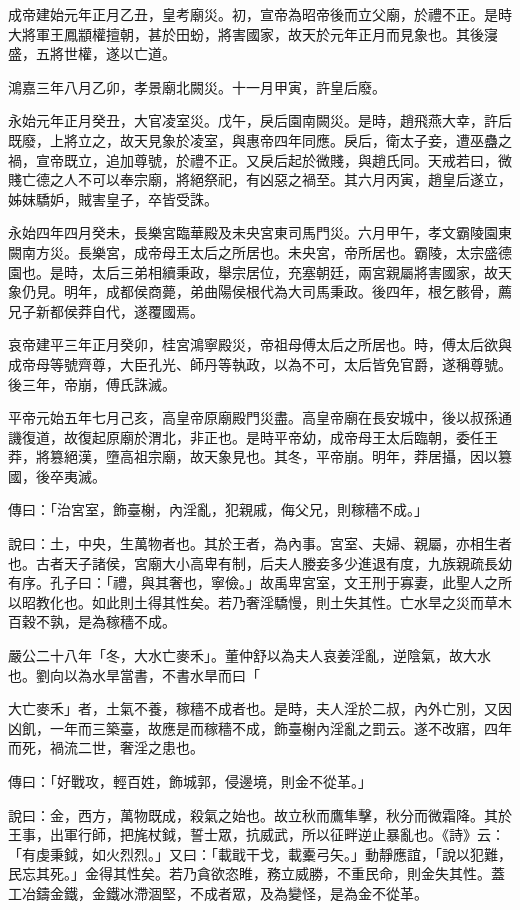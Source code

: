 \begin{pinyinscope}
成帝建始元年正月乙丑，皇考廟災。初，宣帝為昭帝後而立父廟，於禮不正。是時大將軍王鳳顓權擅朝，甚於田蚡，將害國家，故天於元年正月而見象也。其後寖盛，五將世權，遂以亡道。

鴻嘉三年八月乙卯，孝景廟北闕災。十一月甲寅，許皇后廢。

永始元年正月癸丑，大官凌室災。戊午，戾后園南闕災。是時，趙飛燕大幸，許后既廢，上將立之，故天見象於凌室，與惠帝四年同應。戾后，衛太子妾，遭巫蠱之禍，宣帝既立，追加尊號，於禮不正。又戾后起於微賤，與趙氏同。天戒若曰，微賤亡德之人不可以奉宗廟，將絕祭祀，有凶惡之禍至。其六月丙寅，趙皇后遂立，姊妺驕妒，賊害皇子，卒皆受誅。

永始四年四月癸未，長樂宮臨華殿及未央宮東司馬門災。六月甲午，孝文霸陵園東闕南方災。長樂宮，成帝母王太后之所居也。未央宮，帝所居也。霸陵，太宗盛德園也。是時，太后三弟相續秉政，舉宗居位，充塞朝廷，兩宮親屬將害國家，故天象仍見。明年，成都侯商薨，弟曲陽侯根代為大司馬秉政。後四年，根乞骸骨，薦兄子新都侯莽自代，遂覆國焉。

哀帝建平三年正月癸卯，桂宮鴻寧殿災，帝祖母傅太后之所居也。時，傅太后欲與成帝母等號齊尊，大臣孔光、師丹等執政，以為不可，太后皆免官爵，遂稱尊號。後三年，帝崩，傅氏誅滅。

平帝元始五年七月己亥，高皇帝原廟殿門災盡。高皇帝廟在長安城中，後以叔孫通譏復道，故復起原廟於渭北，非正也。是時平帝幼，成帝母王太后臨朝，委任王莽，將篡絕漢，墮高祖宗廟，故天象見也。其冬，平帝崩。明年，莽居攝，因以篡國，後卒夷滅。

傳曰：「治宮室，飾臺榭，內淫亂，犯親戚，侮父兄，則稼穡不成。」

說曰：土，中央，生萬物者也。其於王者，為內事。宮室、夫婦、親屬，亦相生者也。古者天子諸侯，宮廟大小高卑有制，后夫人媵妾多少進退有度，九族親疏長幼有序。孔子曰：「禮，與其奢也，寧儉。」故禹卑宮室，文王刑于寡妻，此聖人之所以昭教化也。如此則土得其性矣。若乃奢淫驕慢，則土失其性。亡水旱之災而草木百穀不孰，是為稼穡不成。

嚴公二十八年「冬，大水亡麥禾」。董仲舒以為夫人哀姜淫亂，逆陰氣，故大水也。劉向以為水旱當書，不書水旱而曰「

大亡麥禾」者，土氣不養，稼穡不成者也。是時，夫人淫於二叔，內外亡別，又因凶飢，一年而三築臺，故應是而稼穡不成，飾臺榭內淫亂之罰云。遂不改寤，四年而死，禍流二世，奢淫之患也。

傳曰：「好戰攻，輕百姓，飾城郭，侵邊境，則金不從革。」

說曰：金，西方，萬物既成，殺氣之始也。故立秋而鷹隼擊，秋分而微霜降。其於王事，出軍行師，把旄杖鉞，誓士眾，抗威武，所以征畔逆止暴亂也。《詩》云：「有虔秉鉞，如火烈烈。」又曰：「載戢干戈，載櫜弓矢。」動靜應誼，「說以犯難，民忘其死。」金得其性矣。若乃貪欲恣睢，務立威勝，不重民命，則金失其性。蓋工冶鑄金鐵，金鐵冰滯涸堅，不成者眾，及為變怪，是為金不從革。


\end{pinyinscope}
